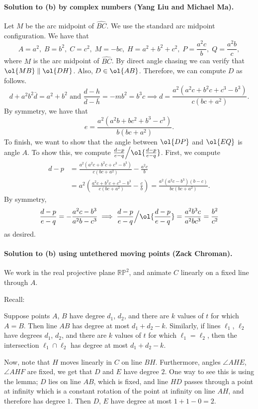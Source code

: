 \documentclass[11pt]{scrartcl}
\begin{document}
\paragraph{Solution to (b) by complex numbers (Yang Liu and Michael Ma).}
Let $M$ be the arc midpoint of $\widehat{BC}$.
We use the standard arc midpoint configuration.
We have that
\[ A = a^2, \; B = b^2, \; C = c^2, \; M = -bc, \;
H = a^2+b^2+c^2, \; P = \frac{a^2c}{b}, \; Q = \frac{a^2b}{c}, \]
where $M$ is the arc midpoint of $\widehat{BC}$.
By direct angle chasing we can verify that $\ol{MB} \parallel \ol{DH}$.
Also, $D \in \ol{AB}$.
Therefore, we can compute $D$ as follows.
\[ d + a^2b^2 \bar{d} = a^2+b^2 \text{ and }
  \frac{d-h}{\bar{d} - \bar{h}} = -mb^2 = b^3c \implies
  d = \frac{a^2(a^2c+b^2c+c^3-b^3)}{c(bc+a^2)}. \]
By symmetry, we have that
\[ e = \frac{a^2(a^2b+bc^2+b^3-c^3)}{b(bc+a^2)}. \]
To finish, we want to show that the angle
between $\ol{DP}$ and $\ol{EQ}$ is angle $A$.
To show this, we compute
$\frac{d-p}{e-q} \Big/ \ol{\frac{d-p}{e-q}}$.
First, we compute
\begin{align*}
  d-p &= \frac{a^2(a^2c+b^2c+c^3-b^3)}{c(bc+a^2)} - \frac{a^2c}{b} \\
  &= a^2 \left(\frac{a^2c+b^2c+c^3-b^3}{c(bc+a^2)} - \frac{c}{b} \right)
  = \frac{a^2(a^2c-b^3)(b-c)}{bc(bc+a^2)}.
\end{align*}
By symmetry,
\[ \frac{d-p}{e-q} = -\frac{a^2c-b^3}{a^2b-c^3}
  \implies \frac{d-p}{e-q} \Big/ \ol{\frac{d-p}{e-q}}
  = \frac{a^2b^3c}{a^2bc^3} = \frac{b^2}{c^2} \]
as desired.

\paragraph{Solution to (b) using untethered moving points (Zack Chroman).}
We work in the real projective plane $\mathbb{RP}^2$,
and animate $C$ linearly on a fixed line through $A$.

Recall:
\begin{lemma*}
  Suppose points $A$, $B$ have degree $d_1$, $d_2$,
  and there are $k$ values of $t$ for which $A=B$.
  Then line $AB$ has degree at most $d_1+d_2-k$.
  Similarly, if lines $\ell_1$, $\ell_2$ have degrees $d_1$, $d_2$,
  and there are $k$ values of $t$ for which $\ell_1=\ell_2$,
  then the intersection $\ell_1 \cap \ell_2$ has degree at most $d_1+d_2-k$.
\end{lemma*}

Now, note that $H$ moves linearly in $C$ on line $BH$.
Furthermore, angles $\angle AHE$, $\angle AHF$ are fixed,
we get that $D$ and $E$ have degree $2$.
One way to see this is using the lemma; $D$ lies on line $AB$,
which is fixed, and line $HD$ passes through a point at infinity
which is a constant rotation of the point at infinity on line $AH$,
and therefore has degree $1$.
Then $D$, $E$ have degree at most $1+1-0=2$.
\end{document}
